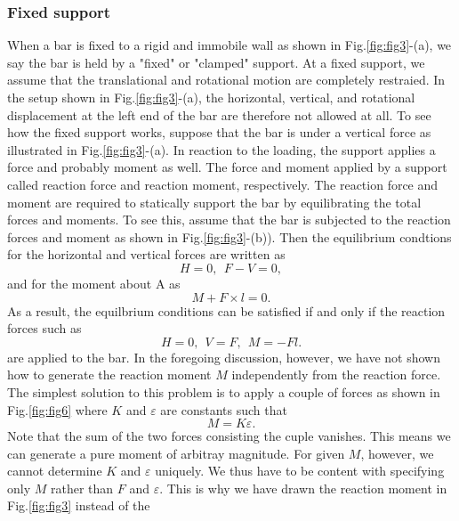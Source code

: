 \documentclass[10pt,a4j]{article}
\begin{document}
\subsubsection{Fixed support}
When a bar is fixed to a rigid and immobile wall as shown in Fig.\ref{fig:fig3}-(a), 
we say the bar is held by a "fixed" or "clamped" support. 
At a fixed support, we assume that the translational and rotational motion 
are completely restraied. In the setup shown in Fig.\ref{fig:fig3}-(a),  
the horizontal, vertical, and rotational displacement at the left end of 
the bar are therefore not allowed at all. To see how the fixed support works, 
suppose that the bar is under a vertical force as illustrated in Fig.\ref{fig:fig3}-(a).
In reaction to the loading, the support applies a force and probably moment as well.   
The force and moment applied by a support called reaction force and reaction moment, respectively. 
The reaction force and moment are required to statically support the bar by 
equilibrating the total forces and moments. 
To see this, assume that the bar is subjected to the reaction forces and  moment 
as shown in Fig.\ref{fig:fig3}-(b)). Then the equilibrium condtions for the horizontal 
and vertical forces are written as 
\begin{equation}
	H=0, \ \ F-V=0, 
	\label{eqn:}
\end{equation}
and for the moment about A as 
\begin{equation}
	M+F\times l =0.
	\label{eqn:}
\end{equation}
As a result, the equilbrium conditions can be satisfied if and only if 
the reaction forces such as  
\begin{equation}
	H=0, \ \ V=F, \ \ M=-Fl. 
	\label{eqn:}
\end{equation}
are applied to the bar. In the foregoing discussion, however,   
we have not shown how to generate the reaction moment $M$ independently  
from the reaction force. 
The simplest solution to this problem is to apply a couple of forces 
as shown in Fig.\ref{fig:fig6} where $K$ and $\varepsilon$ are 
constants such that 
\begin{equation}
	M=K\varepsilon.
	\label{eqn:}
\end{equation}
Note that the sum of the two forces consisting the cuple vanishes. 
This means we can generate a pure moment of arbitray magnitude.
For given $M$, however, we cannot determine $K$ and $\varepsilon$ uniquely. 
We thus have to be content with specifying only $M$ rather than $F$ and $\varepsilon$. 
This is why we have drawn the reaction moment in Fig.\ref{fig:fig3} instead of the 
\end{document}
